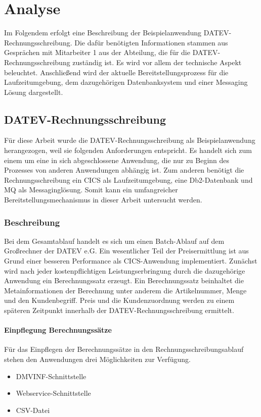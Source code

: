 \chapter{Analyse}\label{ch:analyse}
Im Folgendem erfolgt eine Beschreibung der Beispielanwendung \glqq DATEV-Rechnungsschreibung\grqq.
Die dafür benötigten Informationen stammen aus Gesprächen mit Mitarbeiter 1 aus der Abteilung, die für die DATEV-Rechnungsschreibung zuständig ist.
Es wird vor allem der technische Aspekt beleuchtet.
Anschließend wird der aktuelle Bereitstellungsprozess für die Laufzeitumgebung, dem dazugehörigen Datenbanksystem und einer Messaging Lösung dargestellt.

\section{DATEV-Rechnungsschreibung}
Für diese Arbeit wurde die DATEV-Rechnungsschreibung als Beispielanwendung herangezogen, weil sie folgenden Anforderungen entspricht.
Es handelt sich zum einem um eine in sich abgeschlossene Anwendung, die nur zu Beginn des Prozesses von anderen Anwendungen abhängig ist.
Zum anderen benötigt die Rechnungsschreibung ein CICS als Laufzeitumgebung, eine Db2-Datenbank und MQ als Messaginglösung.
Somit kann ein umfangreicher Bereitstellungsmechanismus in dieser Arbeit untersucht werden.

\subsection{Beschreibung}\label{rechBesch}
Bei dem Gesamtablauf handelt es sich um einen Batch-Ablauf auf dem Großrechner der DATEV e.G.
Ein wesentlicher Teil der Preisermittlung ist aus Grund einer besseren Performance als CICS-Anwendung implementiert.
Zunächst wird nach jeder kostenpflichtigen Leistungserbringung durch die dazugehörige Anwendung ein Berechnungssatz erzeugt.
Ein Berechnungssatz beinhaltet die Metainformationen der Berechnung unter anderem die Artikelnummer, Menge und den Kundenbegriff.
Preis und die Kundenzuordnung werden zu einem späteren Zeitpunkt innerhalb der DATEV-Rechnungsschreibung ermittelt.

\subsubsection{Einpflegung Berechnungssätze}
Für das Einpflegen der Berechnungssätze in den Rechnungsschreibungsablauf stehen den Anwendungen drei Möglichkeiten zur Verfügung.
\begin{itemize}
\item DMVINF-Schnittstelle
\item Webservice-Schnittstelle
\item CSV-Datei
\end{itemize}

